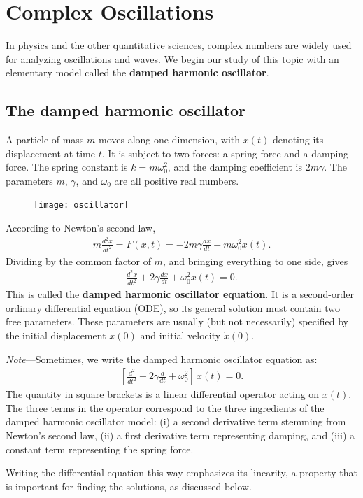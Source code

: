 \documentclass[10pt,a4paper]{article}
\begin{document}
\setcounter{page}{31}

\section{Complex Oscillations}
\label{complex-oscillations}

In physics and the other quantitative sciences, complex numbers are
widely used for analyzing oscillations and waves. We begin our study
of this topic with an elementary model called the \textbf{damped
  harmonic oscillator}.

\subsection{The damped harmonic oscillator}
\label{the-damped-harmonic-oscillator}

A particle of mass $m$ moves along one dimension, with $x(t)$ denoting
its displacement at time $t$. It is subject to two forces: a spring
force and a damping force. The spring constant is $k = m\omega_0^2$,
and the damping coefficient is $2m \gamma$.  The parameters $m$,
$\gamma$, and $\omega_0$ are all positive real numbers.

\begin{figure}[ht]
  \centering\texttt{[image: oscillator]}
\end{figure}

According to Newton's second law,
\begin{align}
  m \frac{d^2 x}{dt^2} = F(x,t) = - 2m\gamma \frac{dx}{dt} - m\omega_0^2 x(t).
\end{align}
Dividing by the common factor of $m$, and bringing everything to one
side, gives
\begin{align}
  \frac{d^2 x}{dt^2} + 2\gamma \frac{dx}{dt} + \omega_0^2 x(t) = 0.
\end{align}
This is called the \textbf{damped harmonic oscillator equation}. It is
a second-order ordinary differential equation (ODE), so its general
solution must contain two free parameters. These parameters are
usually (but not necessarily) specified by the initial displacement
$x(0)$ and initial velocity $\dot{x}(0)$.

\begin{framed}\noindent
  \textit{Note}---Sometimes, we write the damped harmonic oscillator
  equation as:
  \begin{align}
    \left[\frac{d^2}{dt^2} + 2\gamma \frac{d}{dt} + \omega_0^2 \right]\, x(t) = 0.
  \end{align}
  The quantity in square brackets is a linear differential operator acting on $x(t)$.  The three terms in the operator correspond to the three ingredients of the damped harmonic oscillator model: (i) a second derivative term stemming from Newton's second law, (ii) a first derivative term representing damping, and (iii) a constant term representing the spring force.

  Writing the differential equation this way emphasizes its linearity,
  a property that is important for finding the solutions, as discussed
  below.
\end{framed}
\end{document}
